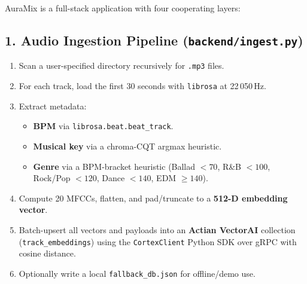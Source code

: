 \documentclass[11pt,a4paper]{article}
\begin{document}
AuraMix is a full-stack application with four cooperating layers:

\subsection{1. Audio Ingestion Pipeline (\texttt{backend/ingest.py})}
\begin{enumerate}[leftmargin=1.5em]
  \item Scan a user-specified directory recursively for \texttt{.mp3} files.
  \item For each track, load the first 30 seconds with \texttt{librosa} at 22\,050\,Hz.
  \item Extract metadata:
        \begin{itemize}
          \item \textbf{BPM} via \texttt{librosa.beat.beat\_track}.
          \item \textbf{Musical key} via a chroma-CQT argmax heuristic.
          \item \textbf{Genre} via a BPM-bracket heuristic (Ballad $<70$, R\&B $<100$, Rock/Pop $<120$, Dance $<140$, EDM $\geq140$).
        \end{itemize}
  \item Compute 20 MFCCs, flatten, and pad/truncate to a \textbf{512-D embedding vector}.
  \item Batch-upsert all vectors and payloads into an \textbf{Actian VectorAI} collection (\texttt{track\_embeddings}) using the \texttt{CortexClient} Python SDK over gRPC with cosine distance.
  \item Optionally write a local \texttt{fallback\_db.json} for offline/demo use.
\end{enumerate}
\end{document}
